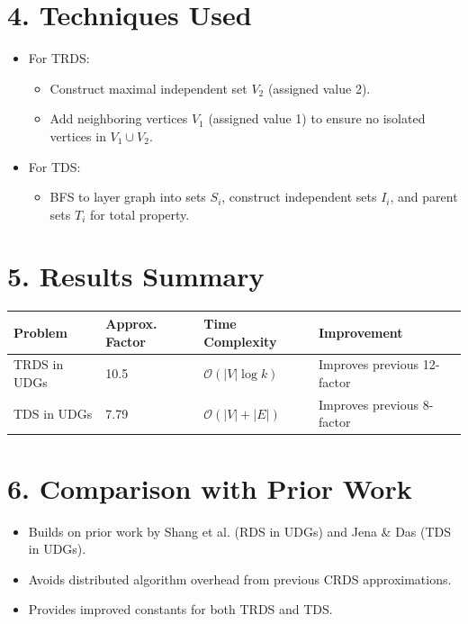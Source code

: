 \documentclass{article}
\begin{document}
\section*{4. Techniques Used}
\begin{itemize}[leftmargin=1.5em]
    \item For TRDS:
    \begin{itemize}
        \item Construct maximal independent set \( V_2 \) (assigned value 2).
        \item Add neighboring vertices \( V_1 \) (assigned value 1) to ensure no isolated vertices in \( V_1 \cup V_2 \).
    \end{itemize}
    \item For TDS:
    \begin{itemize}
        \item BFS to layer graph into sets \( S_i \), construct independent sets \( I_i \), and parent sets \( T_i \) for total property.
    \end{itemize}
\end{itemize}

\section*{5. Results Summary}
\begin{tabular}{|l|l|l|l|}
\hline
\textbf{Problem} & \textbf{Approx. Factor} & \textbf{Time Complexity} & \textbf{Improvement} \\
\hline
TRDS in UDGs & 10.5 & \( \mathcal{O}(|V| \log k) \) & Improves previous 12-factor \\
TDS in UDGs & 7.79 & \( \mathcal{O}(|V| + |E|) \) & Improves previous 8-factor \\
\hline
\end{tabular}

\vspace{1em}

\section*{6. Comparison with Prior Work}
\begin{itemize}[leftmargin=1.5em]
    \item Builds on prior work by Shang et al. (RDS in UDGs) and Jena \& Das (TDS in UDGs).
    \item Avoids distributed algorithm overhead from previous CRDS approximations.
    \item Provides improved constants for both TRDS and TDS.
\end{itemize}
\end{document}
